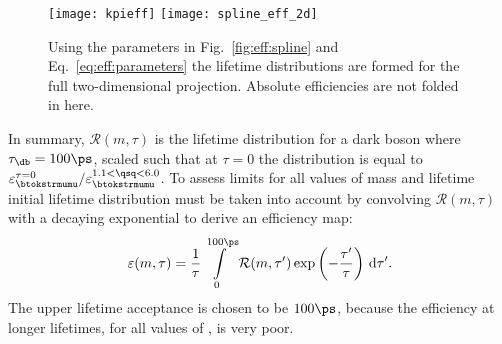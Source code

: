 \begin{figure}
  \begin{center}
    \texttt{[image: kpieff]}
    \texttt{[image: spline\_eff\_2d]}
    \caption{
      Using the parameters in Fig.~\ref{fig:eff:spline} and Eq.~\protect\ref{eq:eff:parameters} the
      lifetime distributions are formed for the full two-dimensional projection.
      Absolute efficiencies are not folded in here.
    }
    \label{fig:eff:effmap}
  \end{center}
\end{figure}



In summary, $\mathcal{R}(m,\tau)$ is the lifetime distribution for a dark boson where
$\tau_\db=100\ps$,
scaled such that at $\tau=0$ the distribution is equal to
$\varepsilon_{\btokstrmumu}^{\tau=0} / \varepsilon_{\btokstrmumu}^{1.1<\qsq<6.0}$.
To assess limits for all values of mass and lifetime initial lifetime distribution must be taken
into account by convolving $\mathcal{R}(m,\tau)$ with a decaying exponential to derive an
efficiency map:
\begin{equation}
  \varepsilon(m,\tau) =
  \frac{1}{\tau}\int\limits_0^{100\ps}
  \mathcal{R}(m,\tau^{\prime})
  \exp\left(-\frac{\tau^{\prime}}{\tau}\right)
  \,{\rm d}\tau^{\prime}.
\end{equation}
The upper lifetime acceptance is chosen to be $100\ps$, because the efficiency at longer lifetimes,
for all values of \mass{\db}, is very poor.



